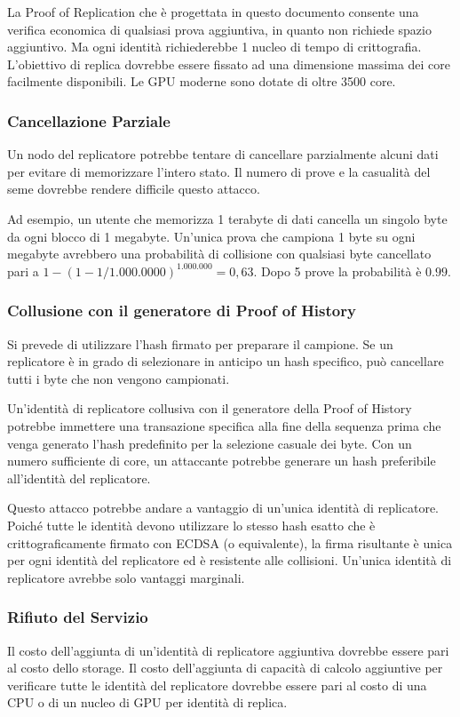 \documentclass[12pt]{article}
\begin{document}
La Proof of Replication che è progettata in questo documento consente una verifica economica di qualsiasi prova aggiuntiva, in quanto non richiede spazio aggiuntivo. Ma ogni identità richiederebbe 1 nucleo di tempo di crittografia. L'obiettivo di replica dovrebbe essere fissato ad una dimensione massima dei core facilmente disponibili. Le GPU moderne sono dotate di oltre 3500 core.

\subsubsection{Cancellazione Parziale}

Un nodo del replicatore potrebbe tentare di cancellare parzialmente alcuni dati per evitare di memorizzare l'intero stato. Il numero di prove e la casualità del seme dovrebbe rendere difficile questo attacco.

Ad esempio, un utente che memorizza 1 terabyte di dati cancella un singolo byte da ogni blocco di 1 megabyte. Un'unica prova che campiona 1 byte su ogni megabyte avrebbero una probabilità di collisione con qualsiasi byte cancellato pari a \(1 - (1- 1/1.000.0000)^{1.000.000} = 0,63\). Dopo 5 prove la probabilità è \(0.99\).

\subsubsection{Collusione con il generatore di Proof of History}

Si prevede di utilizzare l'hash firmato per preparare il campione. Se un replicatore è in grado di selezionare in anticipo un hash specifico, può cancellare tutti i byte che non vengono campionati.

Un'identità di replicatore collusiva con il generatore della Proof of History potrebbe immettere una transazione specifica alla fine della sequenza prima che venga generato l'hash predefinito per la selezione casuale dei byte. Con un numero sufficiente di core, un attaccante potrebbe generare un hash preferibile all'identità del replicatore.

Questo attacco potrebbe andare a vantaggio di un'unica identità di replicatore. Poiché tutte le identità devono utilizzare lo stesso hash esatto che è crittograficamente firmato con ECDSA (o equivalente), la firma risultante è unica per ogni identità del replicatore ed è resistente alle collisioni. Un'unica identità di replicatore avrebbe solo vantaggi marginali.
\subsubsection{Rifiuto del Servizio}
Il costo dell'aggiunta di un'identità di replicatore aggiuntiva dovrebbe essere pari al costo dello storage. Il costo dell'aggiunta di capacità di calcolo aggiuntive per verificare tutte le identità del replicatore dovrebbe essere pari al costo di una CPU o di un nucleo di GPU per identità di replica.
\end{document}
